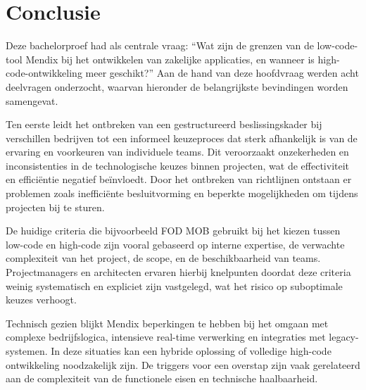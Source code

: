 
\chapter{Conclusie}%
\label{ch:conclusie}


Deze bachelorproef had als centrale vraag: “Wat zijn de grenzen van de low-code-tool Mendix bij het ontwikkelen van zakelijke applicaties, en wanneer is high-code-ontwikkeling meer geschikt?” Aan de hand van deze hoofdvraag werden acht deelvragen onderzocht, waarvan hieronder de belangrijkste bevindingen worden samengevat.

Ten eerste leidt het ontbreken van een gestructureerd beslissingskader bij verschillen bedrijven tot een informeel keuzeproces dat sterk afhankelijk is van de ervaring en voorkeuren van individuele teams. Dit veroorzaakt onzekerheden en inconsistenties in de technologische keuzes binnen projecten, wat de effectiviteit en efficiëntie negatief beïnvloedt. Door het ontbreken van richtlijnen ontstaan er problemen zoals inefficiënte besluitvorming en beperkte mogelijkheden om tijdens projecten bij te sturen.

De huidige criteria die bijvoorbeeld \gls{FOD MOB} gebruikt bij het kiezen tussen low-code en high-code zijn vooral gebaseerd op interne expertise, de verwachte complexiteit van het project, de scope, en de beschikbaarheid van teams. Projectmanagers en architecten ervaren hierbij knelpunten doordat deze criteria weinig systematisch en expliciet zijn vastgelegd, wat het risico op suboptimale keuzes verhoogt.

Technisch gezien blijkt Mendix beperkingen te hebben bij het omgaan met complexe bedrijfslogica, intensieve real-time verwerking en integraties met legacy-systemen. In deze situaties kan een hybride oplossing of volledige high-code ontwikkeling noodzakelijk zijn. De triggers voor een overstap zijn vaak gerelateerd aan de complexiteit van de functionele eisen en technische haalbaarheid.

